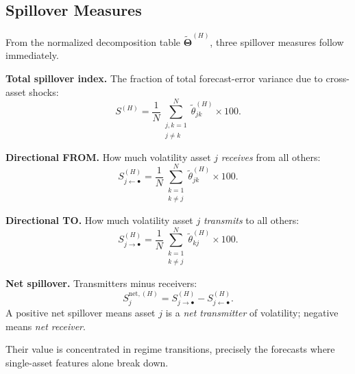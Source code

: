 \subsection{Spillover Measures}

From the normalized decomposition table $\widetilde{\bm{\Theta}}^{(H)}$, three
spillover measures follow immediately.

\begin{keyidea}
\textbf{Total spillover index.}  The fraction of total forecast-error variance due
to cross-asset shocks:
\begin{equation}\label{eq:total-spillover}
  S^{(H)} = \frac{1}{N} \sum_{\substack{j,k=1 \\ j \neq k}}^{N}
    \widetilde{\theta}_{jk}^{(H)} \times 100.
\end{equation}

\textbf{Directional FROM.}  How much volatility asset $j$ \emph{receives} from all
others:
\begin{equation}\label{eq:from-spillover}
  S_{j \leftarrow \bullet}^{(H)}
  = \frac{1}{N} \sum_{\substack{k=1 \\ k \neq j}}^{N}
    \widetilde{\theta}_{jk}^{(H)} \times 100.
\end{equation}

\textbf{Directional TO.}  How much volatility asset $j$ \emph{transmits} to all
others:
\begin{equation}\label{eq:to-spillover}
  S_{j \rightarrow \bullet}^{(H)}
  = \frac{1}{N} \sum_{\substack{k=1 \\ k \neq j}}^{N}
    \widetilde{\theta}_{kj}^{(H)} \times 100.
\end{equation}

\textbf{Net spillover.}  Transmitters minus receivers:
\begin{equation}\label{eq:net-spillover}
  S_j^{\text{net},(H)}
  = S_{j \rightarrow \bullet}^{(H)} - S_{j \leftarrow \bullet}^{(H)}.
\end{equation}
A positive net spillover means asset $j$ is a \emph{net transmitter} of volatility;
negative means \emph{net receiver}.
\end{keyidea}

\begin{projectconnection}
Their
value is concentrated in regime transitions, precisely the forecasts where
single-asset features alone break down.
\end{projectconnection}


